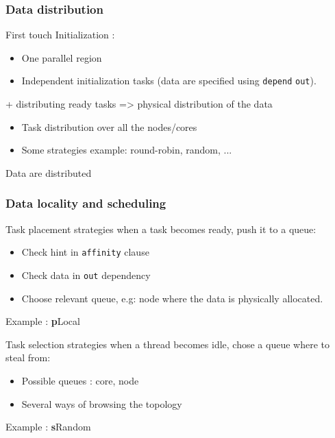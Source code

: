 \documentclass[xcolor={usenames,dvipsnames,svgnames,table}, aspectratio=43]{beamer}
\begin{document}
\begin{frame}[fragile]
  \frametitle{Data distribution}
  \begin{block}{First touch}
    Initialization :
    \begin{itemize}
      \item One parallel region
      \item Independent initialization tasks (data are specified using \verb/depend/ \verb/out/).
    \end{itemize}
  \end{block}
  \begin{block}{+ distributing ready tasks => physical distribution of the data}
    \begin{itemize}
      \item Task distribution over all the nodes/cores
      \item Some strategies example: round-robin, random, ...
    \end{itemize}
  \end{block}
  \alert{Data are distributed}
\end{frame}





\begin{frame}[fragile]
  \frametitle{Data locality and scheduling}

  \begin{block}{Task placement strategies}
    when a task becomes ready, push it to a queue:
    \begin{itemize}
      \item Check hint in \verb/affinity/ clause
      \item Check data in \verb/out/ dependency
      \item Choose relevant queue, e.g: node where the data is physically allocated.
    \end{itemize}
    Example : \textbf{p}Local
  \end{block}

  \begin{block}{Task selection strategies}
    when a thread becomes idle, chose a queue where to steal from:
    \begin{itemize}
      \item Possible queues : core, node
      \item Several ways of browsing the topology
    \end{itemize}
    Example : \textbf{s}Random
  \end{block}

\end{frame}
\end{document}
